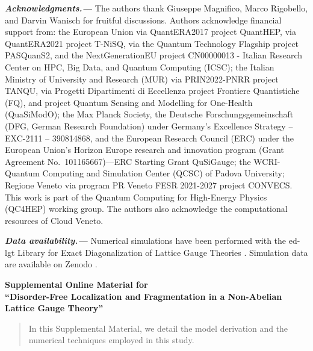 \documentclass[aps,prl,reprint,twocolumn,superscriptaddress,floatfix,nofootinbib]{revtex4-2}
\begin{document}
\textbf{\textit{Acknowledgments.---}}
The authors thank Giuseppe Magnifico, Marco Rigobello, and Darvin Wanisch for fruitful discussions.
Authors acknowledge financial support from: the European Union via QuantERA2017 project QuantHEP, via QuantERA2021 project T-NiSQ, via the Quantum Technology Flagship project PASQuanS2, and the NextGenerationEU project CN00000013 - Italian Research Center on HPC, Big Data, and Quantum Computing (ICSC);
the Italian Ministry of University and Research (MUR) via PRIN2022-PNRR project TANQU, via Progetti Dipartimenti di Eccellenza project Frontiere Quantistiche (FQ), and project Quantum Sensing and Modelling for One-Health (QuaSiModO);
the Max Planck Society, the Deutsche Forschungsgemeinschaft (DFG, German Research Foundation) under Germany's Excellence Strategy – EXC-2111 – 390814868, and the European Research Council (ERC) under the European Union's Horizon Europe research and innovation program (Grant Agreement No.~101165667)—ERC Starting Grant QuSiGauge; the WCRI-Quantum Computing and Simulation Center (QCSC) of Padova University;
Regione Veneto via program PR Veneto FESR 2021-2027 project CONVECS.
This work is part of the Quantum Computing for High-Energy Physics (QC4HEP) working group.
The authors also acknowledge the computational resources of Cloud Veneto.

\textbf{\textit{Data availability.---}}
Numerical simulations have been performed with the \textrm{ed-lgt} Library for Exact Diagonalization of Lattice Gauge Theories \cite{Cataldi2026EdlgtExactDiagonalization}.
Simulation data are available on Zenodo \cite{Cataldi2026DataCodeDisorderFree}.



\clearpage
\onecolumngrid
\begin{center}
    \textbf{\large Supplemental Online Material for \\``Disorder-Free Localization and Fragmentation in a Non-Abelian Lattice Gauge Theory'' }\\[5pt]
    \vspace{0.1cm}
    \begin{quote}
        {\small In this Supplemental Material, we detail the model derivation and the numerical techniques employed in this study.}\\[10pt]
    \end{quote}
\end{center}
\setcounter{equation}{0}
\setcounter{figure}{0}
\setcounter{table}{0}
\setcounter{page}{1}
\setcounter{section}{1}
\makeatletter
\renewcommand{\theequation}{S\arabic{equation}}
\renewcommand{\thefigure}{S\arabic{figure}}
\renewcommand{\thesection}{S\Roman{section}}
\renewcommand{\thepage}{\arabic{page}}
\renewcommand{\thetable}{S\arabic{table}}
\vspace{0cm}
\twocolumngrid
\normalsize
\end{document}
